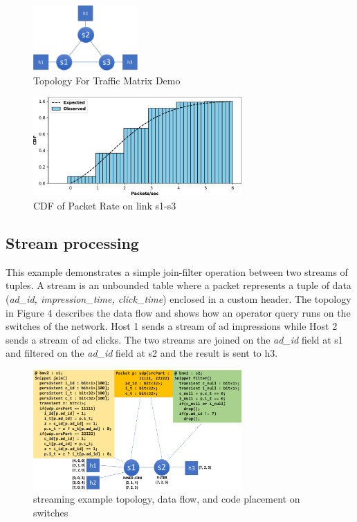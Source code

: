 \begin{figure}[tp]
\centering
\includegraphics[width=40mm,scale=0.7]{figures/traf_mat_topo}
\caption{Topology For Traffic Matrix Demo}
\end{figure}


\begin{figure}[tp]
\centering
\includegraphics[width=80mm,scale=0.7]{figures/exp_obs_cdf}
\caption{CDF of Packet Rate on link s1-s3}
\end{figure}
  
\subsection{Stream processing}
This example demonstrates a simple join-filter operation between two streams of
tuples. A stream is an unbounded table where a packet represents a tuple of
data (\textit{ad\_id, impression\_time, click\_time}) enclosed in a custom
header. The topology in Figure 4 describes the data flow and shows how an
operator query runs on the switches of the network. Host 1 sends a stream of ad
impressions while Host 2 sends a stream of ad clicks. The two streams are
joined on the \textit{ad\_id} field at s1 and filtered on the \textit{ad\_id}
field at s2 and the result is sent to h3. 

\begin{figure}[tp]
\centering
\includegraphics[width=80mm,scale=0.7]{figures/streaming_example}
\caption{streaming example topology, data flow, and code placement on switches}
\vspace{-5mm}
\end{figure}
\vspace{-5mm}


